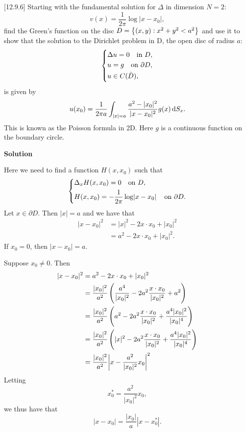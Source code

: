 \documentclass{article}
\begin{document}
[12.9.6] Starting with the fundamental solution for $\Delta$ in
dimension $N = 2$:
%
\begin{equation}
    v(x) = \frac{1}{2 \pi} \log |x - x_0|
    ,
\end{equation}
%
find the Green's function on the disc
$D = \cbr{(x, y): x^2 + y^2 < a^2}$ and use it to show that the solution
to the Dirichlet problem in D, the open disc of radius $a$:
%
\begin{equation}
    \begin{dcases}
        \Delta u = 0 \quad \text{in } D, \\
        u = g \quad \text{on } \partial D, \\
        u \in C(\bar{D}),
    \end{dcases}
    \label{eq:2-ueq}
\end{equation}
%
is given by
%
\begin{equation*}
    u(x_0) = \frac{1}{2 \pi a}
        \int_{|x| = a} \frac{a^2 - |x_0|^2}{|x - x_0|^2} g(x) \dif S_x
        .
\end{equation*}
%
This is known as the Poisson formula in 2D. Here $g$ is a continuous
function on the boundary circle.

\textbf{Solution}

Here we need to find a function $H(x, x_0)$ such that
%
\begin{equation}
    \begin{dcases}
        \Delta_x H(x, x_0) = 0 \quad \text{on } D, \\
        H(x, x_0) = -\frac{1}{2 \pi} \log \envert{x - x_0} \quad \text{on } \partial D.
    \end{dcases}
    \label{eq:2-h}
\end{equation}
%
Let $x \in \partial D$. Then $|x| = a$ and we have that
%
\begin{align*}
    |x - x_0|^2
        &= |x|^2 - 2 x \cdot x_0 + |x_0|^2 \\
        &= a^2 - 2 x \cdot x_0 + |x_0|^2
        .
\end{align*}
%
If $x_0 = 0$, then $|x - x_0| = a$.

Suppose $x_0 \neq 0$. Then
%
\begin{align*}
    |x - x_0|^2
        &= a^2 - 2 x \cdot x_0 + |x_0|^2 \\
        &= \frac{|x_0|^2}{a^2} \del{\frac{a^4}{|x_0|^2} - 2 a^2 \frac{x \cdot x_0}{|x_0|^2} + a^2} \\
        &= \frac{|x_0|^2}{a^2} \del{a^2 - 2 a^2 \frac{x \cdot x_0}{|x_0|^2} + \frac{a^4 |x_0|^2}{|x_0|^4}} \\
        &= \frac{|x_0|^2}{a^2} \del{|x|^2 - 2 a^2 \frac{x \cdot x_0}{|x_0|^2} + \frac{a^4 |x_0|^2}{|x_0|^4}} \\
        &= \frac{|x_0|^2}{a^2} \envert[3]{x - \frac{a^2}{|x_0|^2} x_0}^2
\end{align*}
%
Letting
%
\begin{equation*}
    x_0^* = \frac{a^2}{|x_0|^2} x_0
    ,
\end{equation*}
%
we thus have that
%
\begin{equation*}
    |x - x_0| = \frac{|x_0|}{a} |x - x_0^*|
    .
\end{equation*}
\end{document}

